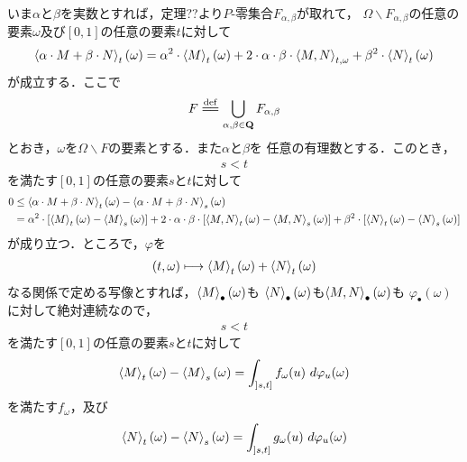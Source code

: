 	\begin{sketch}
		いま$\alpha$と$\beta$を実数とすれば，定理??より$P$-零集合$F_{\alpha,\beta}$が取れて，
		$\Omega \backslash F_{\alpha,\beta}$の任意の要素$\omega$及び$[0,1]$の任意の要素$t$に対して
		\begin{align}
			\inprod<\alpha \cdot M + \beta \cdot N>_{t}(\omega)
			= \alpha^{2} \cdot \inprod<M>_{t}(\omega) 
			+ 2 \cdot \alpha \cdot \beta \cdot \inprod<M,N>_{t,\omega}
			+ \beta^{2} \cdot \inprod<N>_{t}(\omega)
		\end{align}
		が成立する．ここで
		\begin{align}
			F \defeq \bigcup_{\alpha, \beta \in \Q} F_{\alpha,\beta}
		\end{align}
		とおき，$\omega$を$\Omega \backslash F$の要素とする．また$\alpha$と$\beta$を
		任意の有理数とする．このとき，
		\begin{align}
			s < t
		\end{align}
		を満たす$[0,1]$の任意の要素$s$と$t$に対して
		\begin{align}
			0 &\leq  \inprod<\alpha \cdot M + \beta \cdot N>_{t}(\omega) 
			- \inprod<\alpha \cdot M + \beta \cdot N>_{s}(\omega) \\
			&= \alpha^{2} \cdot \left[\inprod<M>_{t}(\omega) - \inprod<M>_{s}(\omega)\right]
			+ 2 \cdot \alpha \cdot \beta \cdot 
			\left[\inprod<M,N>_{t}(\omega) - \inprod<M,N>_{s}(\omega)\right]
			+ \beta^{2} \cdot \left[\inprod<N>_{t}(\omega) - \inprod<N>_{s}(\omega)\right]
			\label{fom:Holder_ineqaulity_for_stochastic_integrals_1}
		\end{align}
		が成り立つ．ところで，$\varphi$を
		\begin{align}
			(t,\omega) \longmapsto \inprod<M>_{t}(\omega) + \inprod<N>_{t}(\omega)
		\end{align}
		なる関係で定める写像とすれば，$\inprod<M>_{\bullet}(\omega)$も
		$\inprod<N>_{\bullet}(\omega)$も$\inprod<M,N>_{\bullet}(\omega)$も
		$\varphi_{\bullet}(\omega)$に対して絶対連続なので，
		\begin{align}
			s < t
		\end{align}
		を満たす$[0,1]$の任意の要素$s$と$t$に対して
		\begin{align}
			\inprod<M>_{t}(\omega) - \inprod<M>_{s}(\omega)
			= \int_{]s,t]} f_{\omega}(u)\ d\varphi_{u}(\omega)
		\end{align}
		を満たす$f_{\omega}$，及び
		\begin{align}
			\inprod<N>_{t}(\omega) - \inprod<N>_{s}(\omega)
			= \int_{]s,t]} g_{\omega}(u)\ d\varphi_{u}(\omega)

\end{align}
\end{sketch}
